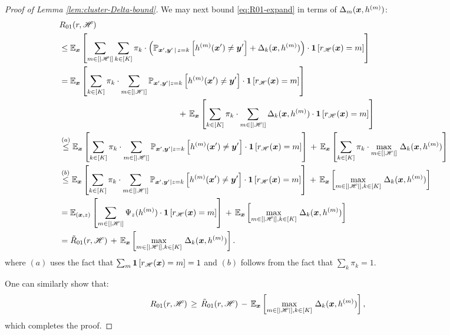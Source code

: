 \begin{proof}[Proof of Lemma \ref{lem:cluster-Delta-bound}]
We may next bound \eqref{eq:R01-expand} in terms of $\Delta_{m}(\boldsymbol{x}, h^{(m)})$:
\begin{align*}
\lefteqn{R_{01}(r,\mathscr{H})} \\
&\leq
\mathbb{E}_{\bx}\left[\sum_{m\in[|\mathscr{H}|]}\sum_{k \in [K]}\pi_k \cdot \Big( 
\mathbb{P}_{\bx',\by'\,|\,z=k}\left[
    h^{(m)}(\bx')\neq\by'
\right]
+ \Delta_{k}(\bx, h^{(m)})
\Big)
\cdot\1\left[r_{\mset}(\bx)=m\right]\right]
\\
&=
\mathbb{E}_{\bx}\left[\sum_{k \in [K]}\pi_k \cdot\sum_{m\in[|\mathscr{H}|]} \mathbb{P}_{\bx', \by'|z=k}\left[h^{(m)}(\bx')\neq\by'\right]\cdot\1\left[r_{\mset}(\bx)=m\right]\right] \\
&\hspace{5cm}
\,+\,
\mathbb{E}_{\bx}\left[\sum_{k \in [K]}\pi_k \cdot \sum_{m\in[|\mathscr{H}|]}\Delta_{k}(\bx, h^{(m)}) \cdot\1\left[r_{\mset}(\bx)=m\right]\right]
\\
& \stackrel{(a)}{\leq}
\mathbb{E}_{\bx}\left[\sum_{k \in [K]}\pi_k \cdot \sum_{m\in[|\mathscr{H}|]} \mathbb{P}_{\bx', \by'|z=k}\left[h^{(m)}(\bx')\neq\by'\right]\cdot\1\left[r_{\mset}(\bx)=m\right]\right] 
\,+\,
\mathbb{E}_{\bx}\left[\sum_{k \in [K]}\pi_k \cdot \max_{m\in[|\mathscr{H}|]}\,\Delta_{k}(\bx, h^{(m)})\right] \\
& \stackrel{(b)}{\leq}
\mathbb{E}_{\bx}\left[\sum_{k \in [K]}\pi_k \cdot \sum_{m\in[|\mathscr{H}|]} \mathbb{P}_{\bx', \by'|z=k}\left[h^{(m)}(\bx')\neq\by'\right]\cdot\1\left[r_{\mset}(\bx)=m\right]\right] 
\,+\,
\mathbb{E}_{\bx}\left[\max_{m\in[|\mathscr{H}|], k\in[K]}\,\Delta_{k}(\bx, h^{(m)})\right]\\
&=
\mathbb{E}_{(\bx, z)}\left[ \sum_{m\in[|\mathscr{H}|]}\LLMEmbedScalar_{z}(h^{(m)})\cdot\1\left[r_{\mset}(\bx)=m\right]\right] 
\,+\,
\mathbb{E}_{\bx}\left[\max_{m\in[|\mathscr{H}|], k\in[K]}\,\Delta_{k}(\bx, h^{(m)})\right]\\
&= \tilde{R}_{01}(r, \mathscr{H}) \,+\,
\mathbb{E}_{\bx}\left[\max_{m\in[|\mathscr{H}|], k\in[K]}\,\Delta_{k}(\bx, h^{(m)})\right].
\end{align*}
where $(a)$ uses the fact that $\sum_m \bm{1}\left[r_{\mathscr{H}}(\boldsymbol{x})=m\right] = 1$ and $(b)$ follows from the fact that $\sum_k \pi_k = 1$.

One can similarly show that:
\[
R_{01}(r,\mathscr{H}) \,\geq\, \tilde{R}_{01}(r,\mathscr{H}) \,-\,
\mathbb{E}_{\boldsymbol{x}}\left[\max_{m\in[|\mathscr{H}|], k\in[K]}\,\Delta_{k}(\boldsymbol{x}, h^{(m)})\right],
\]
which completes the proof.
\end{proof}







